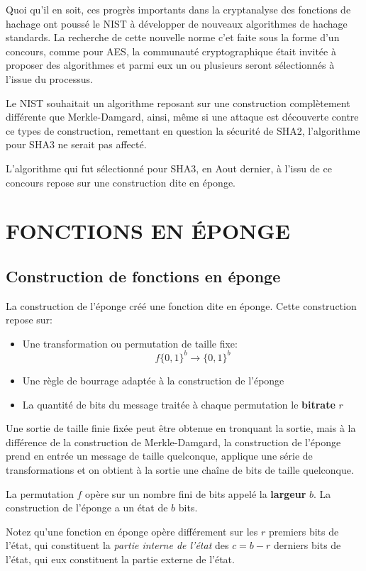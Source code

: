\documentclass[10.5pt, a4paper, twoside, openright]{report}
\begin{document}
Quoi qu'il en soit, ces progrès importants dans la cryptanalyse des fonctions de hachage ont poussé le NIST à développer de nouveaux algorithmes de hachage standards. La recherche de cette nouvelle norme c'et faite sous la forme d'un concours, comme pour AES, la communauté cryptographique était invitée à proposer des algorithmes et parmi eux un ou plusieurs seront sélectionnés à l’issue du processus.

Le NIST souhaitait un algorithme reposant sur une construction complètement différente que Merkle-Damgard, ainsi, même si une attaque est découverte contre ce types de construction, remettant en question la sécurité de SHA2, l'algorithme pour SHA3 ne serait pas affecté.
 
L'algorithme qui fut sélectionné pour SHA3, en Aout dernier, à l'issu de ce concours repose sur une construction dite en éponge. 

\chapter{FONCTIONS EN ÉPONGE}
\section{Construction de fonctions en éponge}
La construction de l'éponge créé une fonction dite en éponge. Cette construction repose sur:
\begin{itemize}
\item{Une transformation ou permutation de taille fixe:
$$f{\{0,1\}}^b \rightarrow {\{0,1\}}^b$$}
\item{Une règle de bourrage adaptée à la construction de l'éponge}
\item{La quantité de bits du message traitée à chaque permutation le \textbf{bitrate} $r$}
\end{itemize}

Une sortie de taille finie fixée peut être obtenue en tronquant la sortie, mais à la différence de la construction de Merkle-Damgard, la construction de l'éponge prend en entrée un message de taille quelconque, applique une série de transformations et on obtient à la sortie une chaîne de bits de taille quelconque.

La permutation $f$ opère sur un nombre fini de bits appelé la \textbf{largeur} $b$. La construction de l'éponge a un état de $b$ bits.

Notez qu'une fonction en éponge opère différement sur les $r$ premiers bits de l'état, qui constituent la \emph{partie interne de l'état} des $c=b-r$ derniers bits de l'état, qui eux constituent la partie externe de l'état.
\end{document}
